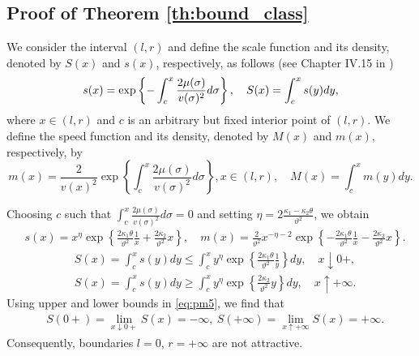 \documentclass[11pt,a4paper] {article}
\begin{document}
\subsection{Proof of Theorem \ref{th:bound_class}}\label{appx:bound_class_proof}
We consider the interval $(l,r)$ and define the scale function and its density, denoted by $S(x)$ and $s(x)$, respectively, as follows (see Chapter IV.15 in \cite{Bor})
\begin{equation} \label {eq:pm2}
s(x)=\exp\left\{-\int_c^x\frac{2\mu(\sigma)}{v(\sigma)^2}d\sigma\right\}, \quad 
S(x)=\int_c^x s(y)dy,\vspace*{-0.5\baselineskip}
\end{equation}
where $x\in (l,r)$ and $c$ is an arbitrary but fixed interior point of $(l,r)$. We define the speed function and its density, denoted by $M(x)$ and $m(x)$, respectively, by
\begin{equation} \label {eq:pm3}
m(x)=\frac{2}{v(x)^2}\exp\left\{\int_c^x\frac{2\mu(\sigma)}{v(\sigma)^2}d\sigma\right\}, x\in (l,r), \quad 
M(x)=\int_c^x m(y)dy.
\end{equation}

Choosing $c$ such that $\int_c^x\frac{2\mu(\sigma)}{v(\sigma)^2}d\sigma=0$ and setting $\eta=2\frac{\kappa_1-\kappa_2\theta}{\vartheta^2}$, we obtain
\begin{equation*}
\begin{split}
&s(x)=x^\eta\exp\left\{\frac{2\kappa_1\theta}{\vartheta^2}\frac{1}{x}+\frac{2\kappa_2}{\vartheta^2}x\right\}, \quad 
m(x)=\frac{2}{\vartheta^2}x^{-\eta-2}\exp\left\{-\frac{2\kappa_1\theta}{\vartheta^2}\frac{1}{x}-\frac{2\kappa_2}{\vartheta^2}x\right\}. 
\end{split}
\end{equation*}
\begin{equation}\label{eq:pm5}
\begin{split}
&S(x)=\int_c^xs(y)dy\le \int_c^xy^\eta\exp\left\{\frac{2\kappa_1\theta}{\vartheta^2}\frac{1}{y}\right\}dy,\quad x\downarrow 0+, \\
&S(x)=\int_c^xs(y)dy\ge \int_c^xy^\eta\exp\left\{\frac{2\kappa_2}{\vartheta^2}y\right\}dy, \quad x\uparrow +\infty.
\end{split}
\end{equation}
Using upper and lower bounds in \eqref{eq:pm5}, we find that
\begin{equation}
\begin{split}
&S(0+)=\lim_{x\downarrow 0+}S(x)=-\infty, \ S(+\infty)=\lim_{x\uparrow +\infty}S(x)=+\infty.
\end{split}
\end{equation}
Consequently, boundaries $l=0$, $r=+\infty$ are not attractive.
\end{document}
